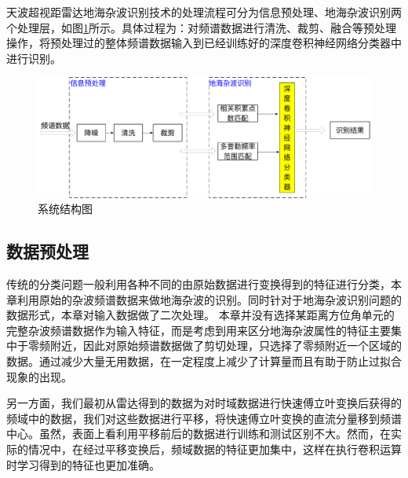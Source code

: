 天波超视距雷达地海杂波识别技术的处理流程可分为信息预处理、地海杂波识别两个处理层，如图\ref{fig:system}所示。具体过程为：对频谱数据进行清洗、裁剪、融合等预处理操作，将预处理过的整体频谱数据输入到已经训练好的深度卷积神经网络分类器中进行识别。

\begin{figure}[H]
	\centering
	\includegraphics[width=\textwidth]{figures/othr/system}
	\caption{系统结构图}
	\label{fig:system}
\end{figure}

\subsection{数据预处理}
传统的分类问题一般利用各种不同的由原始数据进行变换得到的特征进行分类，本章利用原始的杂波频谱数据来做地海杂波的识别。同时针对于地海杂波识别问题的数据形式，本章对输入数据做了二次处理。
本章并没有选择某距离方位角单元的完整杂波频谱数据作为输入特征，而是考虑到用来区分地海杂波属性的特征主要集中于零频附近，因此对原始频谱数据做了剪切处理，只选择了零频附近一个区域的数据。通过减少大量无用数据，在一定程度上减少了计算量而且有助于防止过拟合现象的出现。

另一方面，我们最初从雷达得到的数据为对时域数据进行快速傅立叶变换后获得的频域中的数据，我们对这些数据进行平移，将快速傅立叶变换的直流分量移到频谱中心。虽然，表面上看利用平移前后的数据进行训练和测试区别不大。然而，在实际的情况中，在经过平移变换后，频域数据的特征更加集中，这样在执行卷积运算时学习得到的特征也更加准确。

